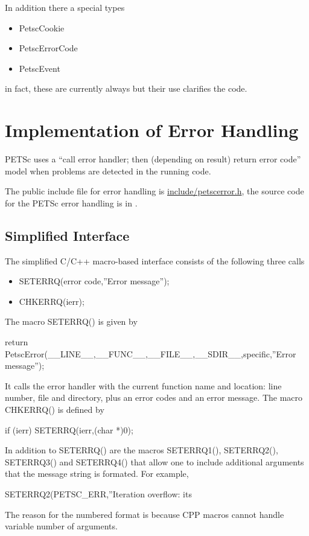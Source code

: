 \documentclass[twoside,12pt]{../sty/report_petsc}
\begin{document}
In addition there a special types
\begin{itemize}
  \item PetscCookie
  \item PetscErrorCode
  \item PetscEvent
\end{itemize}
in fact, these are currently always  but their use clarifies the code.

\section{Implementation of Error Handling}

PETSc  uses a ``call error handler; then (depending on result) return
error code'' model when problems are detected in the running code. 

The public include file for error handling is
 \href{http://www-unix.mcs.anl.gov/petsc/petsc-as/snapshots/petsc-dev/include/petscerror.h.html}{include/petscerror.h}, the 
source code for the PETSc error handling is in  
.

\subsection{Simplified Interface}

The simplified C/C++ macro-based interface consists of the following three calls
\begin{itemize}
\item SETERRQ(error code,''Error message'');
\item CHKERRQ(ierr);
\end{itemize}

The macro SETERRQ() is given by 
\begin{tabbing}
return PetscError(\_\_LINE\_\_,\_\_FUNC\_\_,\_\_FILE\_\_,\_\_SDIR\_\_,specific,''Error message'');
\end{tabbing}
It calls the error handler with the current function name and location: line number,
file and directory, plus an error codes and an error message.
The macro CHKERRQ() is defined by
\begin{tabbing}
  if (ierr) SETERRQ(ierr,(char *)0);
\end{tabbing}

In addition to SETERRQ() are the macros SETERRQ1(), SETERRQ2(), SETERRQ3()
and SETERRQ4() that allow one to include additional arguments that the message
string is formated. For example,
\begin{tabbing}
  SETERRQ2(PETSC\_ERR,''Iteration overflow: its %
\end{tabbing}
The reason for the numbered format is because CPP macros cannot handle variable number
of arguments.
 
\end{document}
